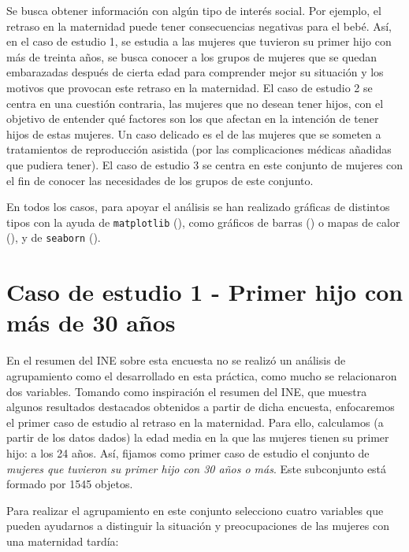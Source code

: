 \documentclass[a4paper, 20pt]{article}
\begin{document}
Se busca obtener información con algún tipo de interés social. Por ejemplo, el retraso en la maternidad puede tener consecuencias negativas para el bebé. Así, en el caso de estudio 1, se estudia a las mujeres que tuvieron su primer hijo con más de treinta años, se busca conocer a los grupos de mujeres que se quedan embarazadas después de cierta edad para comprender mejor su situación y los motivos que provocan este retraso en la maternidad. El caso de estudio 2 se centra en una cuestión contraria, las mujeres que no desean tener hijos, con el objetivo de entender qué factores son los que afectan en la intención de tener hijos de estas mujeres. Un caso delicado es el de las mujeres que se someten a tratamientos de reproducción asistida (por las complicaciones médicas añadidas que pudiera tener). El caso de estudio 3 se centra en este conjunto de mujeres con el fin de conocer las necesidades de los grupos de este conjunto.

En todos los casos, para apoyar el análisis se han realizado gráficas de distintos tipos con la ayuda de \texttt{matplotlib} (\cite{noauthor_lifecycle_nodate}), como gráficos de barras (\cite{noauthor_matplotlib_nodate}) o mapas de calor (\cite{noauthor_creating_nodate}), y de \texttt{seaborn} (\cite{noauthor_example_nodate}).

\section{Caso de estudio 1 - Primer hijo con más de 30 años}
\label{sec:caso1}
En el resumen del INE sobre esta encuesta no se realizó un análisis de agrupamiento como el desarrollado en esta práctica, como mucho se relacionaron dos variables. Tomando como inspiración el resumen \cite{resINE} del INE, que muestra algunos resultados destacados obtenidos a partir de dicha encuesta, enfocaremos el primer caso de estudio al retraso en la maternidad. Para ello, calculamos (a partir de los datos dados) la edad media en la que las mujeres tienen su primer hijo: a los 24 años. Así, fijamos como primer caso de estudio el conjunto de \textit{mujeres que tuvieron su primer hijo con 30 años o más}. Este subconjunto está formado por 1545 objetos.

Para realizar el agrupamiento en este conjunto selecciono cuatro variables que pueden ayudarnos a distinguir la situación y preocupaciones de las mujeres con una maternidad tardía:
\end{document}
